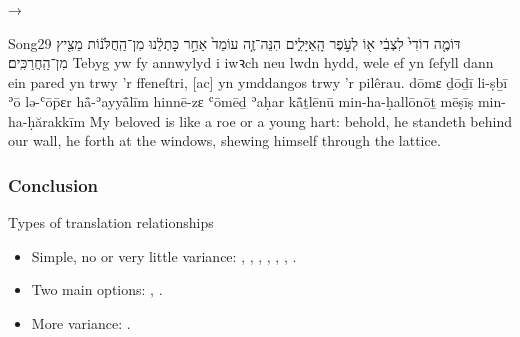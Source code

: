 \subsubsection{}

\begin{frame}{\ex {} → }
	\begin{example}{Song}{2}{9}{}{}
		\quoling
		{דּוֹמֶ֤ה דוֹדִי֙ לִצְבִ֔י א֖וֹ לְעֹ֣פֶר הָֽאַיָּלִ֑ים הִנֵּה־זֶ֤ה עוֹמֵד֙ אַחַ֣ר כָּתְלֵ֔נוּ  מִן־הַֽחֲלֹּנ֔וֹת מֵצִ֖יץ מִן־הַֽחֲרַכִּֽים׃}
		{Tebyg yw fy annwylyd i iwꝛch neu lwdn hydd, wele ef yn ſefyll dann ein pared yn  trwy ’r ffeneſtri, [ac] yn ymddangos trwy ’r pilêrau.}
		{dōmɛ ḏōḏī li-ṣḇī ʾō lə-ʿōp̄ɛr hå̄-ʾayyå̄līm hinnē-zɛ ʿōmēḏ ʾaḥar kå̄ṯlēnū  min-ha-ḥallōnōṯ mēṣīṣ min-ha-ḥărakkīm}
		{My beloved is like a roe or a young hart: behold, he standeth behind our wall, he  forth at the windows, shewing himself through the lattice.}
	\end{example}
\end{frame}



\subsubsection{Conclusion}

\begin{frame}{Types of translation relationships}
	\begin{itemize}
		\item Simple, no or very little variance:
			, , , , , , .
		\item Two main options:
			, .
		\item More variance:
			.
	\end{itemize}
\end{frame}
